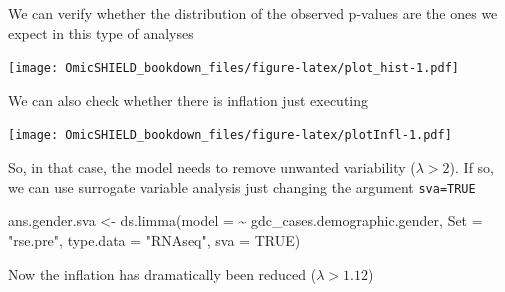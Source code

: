 \documentclass[
]{book}
\newenvironment{Shaded}{\begin{snugshade}}{\end{snugshade}}
\newcommand{\AttributeTok}[1]{\textcolor[rgb]{0.77,0.63,0.00}{#1}}
\newcommand{\ConstantTok}[1]{\textcolor[rgb]{0.00,0.00,0.00}{#1}}
\newcommand{\DecValTok}[1]{\textcolor[rgb]{0.00,0.00,0.81}{#1}}
\newcommand{\FloatTok}[1]{\textcolor[rgb]{0.00,0.00,0.81}{#1}}
\newcommand{\FunctionTok}[1]{\textcolor[rgb]{0.00,0.00,0.00}{#1}}
\newcommand{\NormalTok}[1]{#1}
\newcommand{\OtherTok}[1]{\textcolor[rgb]{0.56,0.35,0.01}{#1}}
\newcommand{\SpecialCharTok}[1]{\textcolor[rgb]{0.00,0.00,0.00}{#1}}
\newcommand{\StringTok}[1]{\textcolor[rgb]{0.31,0.60,0.02}{#1}}
\begin{document}
We can verify whether the distribution of the observed p-values are the ones we expect in this type of analyses

\begin{Shaded}
\end{Shaded}

\texttt{[image: OmicSHIELD\_bookdown\_files/figure-latex/plot\_hist-1.pdf]}

We can also check whether there is inflation just executing

\begin{Shaded}
\end{Shaded}

\texttt{[image: OmicSHIELD\_bookdown\_files/figure-latex/plotInfl-1.pdf]}

So, in that case, the model needs to remove unwanted variability (\(\lambda>2\)). If so, we can use surrogate variable analysis just changing the argument \texttt{sva=TRUE}

\begin{Shaded}
\begin{Highlighting}[]
\NormalTok{ans.gender.sva }\OtherTok{\textless{}{-}} \FunctionTok{ds.limma}\NormalTok{(}\AttributeTok{model =}  \SpecialCharTok{\textasciitilde{}}\NormalTok{ gdc\_cases.demographic.gender, }
                       \AttributeTok{Set =} \StringTok{"rse.pre"}\NormalTok{, }\AttributeTok{type.data =} \StringTok{"RNAseq"}\NormalTok{,}
                       \AttributeTok{sva =} \ConstantTok{TRUE}\NormalTok{)}
\end{Highlighting}
\end{Shaded}

Now the inflation has dramatically been reduced (\(\lambda>1.12\))

\begin{Shaded}
\end{Shaded}
\end{document}
